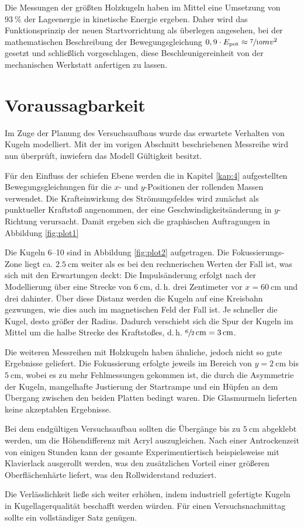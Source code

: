 Die Messungen der größten Holzkugeln haben im Mittel eine Umsetzung von $\SI{93}{\percent}$ der Lageenergie in kinetische Energie ergeben. Daher wird
das Funktionsprinzip der neuen Startvorrichtung als überlegen angesehen,
bei der mathematischen Beschreibung der Bewegungsgleichung $0,9\cdot E_\mathrm{pot}\approx \sfrac{7}{10}mv^2$ gesetzt und schließlich
vorgeschlagen, diese Beschleunigereinheit von der mechanischen Werkstatt anfertigen zu lassen. 

\section{Voraussagbarkeit}
\label{sec:voraus}
Im Zuge der Planung des Versuchsaufbaus wurde das erwartete Verhalten von Kugeln modelliert. Mit der im vorigen Abschnitt beschriebenen Messreihe wird nun überprüft, inwiefern das Modell Gültigkeit besitzt.

Für den Einfluss der schiefen Ebene werden die in Kapitel \ref{kap:4} aufgestellten Bewegungsgleichungen für die $x$- und $y$-Positionen der rollenden Massen verwendet. Die Krafteinwirkung des Strömungsfeldes wird zunächst als punktueller Kraftstoß angenommen, der eine Geschwindigkeitsänderung in $y$-Richtung verursacht. Damit ergeben sich die graphischen Auftragungen in Abbildung \ref{fig:plot1}



\newpage

\noindent Die Kugeln 6--10 sind in Abbildung \ref{fig:plot2} aufgetragen. Die Fokussierungs-Zone liegt ca. $\SI{2.5}{\centi\metre}$ weiter als es bei den rechnerischen Werten der Fall ist, was sich mit den Erwartungen deckt: Die Impulsänderung erfolgt nach der Modellierung über eine Strecke von $\SI{6}{\centi\metre}$, d.\,h. drei Zentimeter vor $x=\SI{60}{\centi\metre}$ und drei dahinter. Über diese Distanz werden die Kugeln auf eine Kreisbahn gezwungen, wie dies auch im magnetischen Feld der Fall ist. Je schneller die Kugel, desto größer der Radius. Dadurch verschiebt sich die Spur der Kugeln im Mittel um die halbe Strecke des Kraftstoßes, d.\,h.  $\sfrac{6}{2}\,\si{\centi\metre}=\SI{3}{\centi\metre}$.

Die weiteren Messreihen mit Holzkugeln haben ähnliche, jedoch nicht so gute Ergebnisse geliefert. Die Fokussierung erfolgte jeweils im Bereich von $y=\SI{2}{\centi\metre}$ bis $\SI{5}{\centi\metre}$, wobei es zu mehr Fehlmessungen gekommen ist, die durch die Asymmetrie der Kugeln, mangelhafte Justierung der Startrampe und ein Hüpfen an dem Übergang zwischen den beiden Platten bedingt waren. Die Glasmurmeln lieferten keine akzeptablen Ergebnisse.

Bei dem endgültigen Versuchsaufbau sollten die Übergänge bis zu $\SI{5}{\centi\metre}$ abgeklebt werden, um die Höhendifferenz mit Acryl auszugleichen. Nach einer Antrockenzeit von einigen Stunden kann der gesamte Experimentiertisch beispielsweise mit Klavierlack ausgerollt werden, was den zusätzlichen Vorteil einer größeren Oberflächenhärte liefert, was den Rollwiderstand reduziert.

Die Verlässlichkeit ließe sich weiter erhöhen, indem industriell gefertigte Kugeln in Kugellagerqualität beschafft werden würden. Für einen Versuchsnachmittag sollte ein vollständiger Satz genügen.